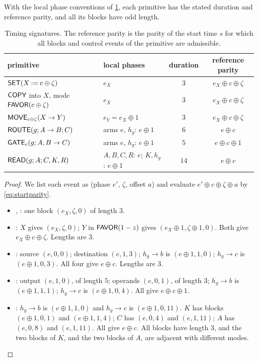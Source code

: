 \begin{lemma}\label{lem:timing}
With the local phase conventions of \cref{tab:timing}, each primitive has the stated duration and
reference parity, and all its blocks have odd length.
\end{lemma}

\begin{table}[ht]
\centering\small
\begin{tabular}{>{\raggedright\arraybackslash}p{4.2cm}>{\raggedright\arraybackslash}p{4.3cm}cc}\toprule
primitive & local phases & duration & reference parity\\\midrule
$\textsf{SET}(X\mathbin{:=}c\oplus\zeta)$ & $e_X$ & $3$ & $e_X\oplus c\oplus\zeta$\\
$\textsf{COPY}$ into $X$, mode $\textsf{FAVOR}(c\oplus\zeta)$ & $e_X$ & $3$ & $e_X\oplus c\oplus\zeta$\\
$\textsf{MOVE}_{c\oplus\zeta}(X\to Y)$ & $e_Y=e_X\oplus 1$ & $3$ & $e_X\oplus c\oplus\zeta$\\
$\textsf{ROUTE}(g;A\to B;C)$ & arms $e$, $h_g$: $e\oplus1$ & $6$ & $e\oplus c$\\
$\textsf{GATE}_c(g;A,B\to C)$ & arms $e$, $h_g$: $e\oplus1$ & $5$ & $e\oplus c\oplus 1$\\
$\textsf{READ}(g;A;C,K,R)$ & $A,B,C,R$: $e$; $K,h_g$: $e\oplus1$ & $14$ & $e\oplus c$\\\bottomrule
\end{tabular}
\caption{Timing signatures. The reference parity is the parity of the start time $s$ for which all
blocks and control events of the primitive are admissible.}
\label{tab:timing}
\end{table}

\begin{proof}
We list each event as (phase $e'$, $\zeta$, offset $a$) and evaluate $e'\oplus c\oplus\zeta\oplus a$
by \eqref{eq:startparity}.
\begin{itemize}
\item {}, : one block $(e_X,\zeta,0)$ of length $3$.
\item {}: $X$ gives $(e_X,\zeta,0)$; $Y$ in $\textsf{FAVOR}(1-z)$ gives
  $(e_X\oplus1,\zeta\oplus 1,0)$. Both give $e_X\oplus c\oplus\zeta$. Lengths are $3$.
\item {}: source $(e,0,0)$; destination $(e,1,3)$; $h_g\to b$ is $(e\oplus1,1,0)$; $h_g\to c$
  is $(e\oplus1,0,3)$. All four give $e\oplus c$. Lengths are $3$.
\item {}: output $(e,1,0)$, of length $5$; operands $(e,0,1)$, of length $3$; $h_g\to b$ is
  $(e\oplus1,1,1)$; $h_g\to c$ is $(e\oplus1,0,4)$. All give $e\oplus c\oplus1$.
\item {}: $h_g\to b$ is $(e\oplus1,1,0)$ and $h_g\to c$ is $(e\oplus1,0,11)$. $K$ has blocks
  $(e\oplus1,0,1)$ and $(e\oplus1,1,4)$; $C$ has $(e,0,4)$ and $(e,1,11)$; $A$ has $(e,0,8)$ and
  $(e,1,11)$. All give $e\oplus c$. All blocks have length $3$, and the two blocks of $K$, and the
  two blocks of $A$, are adjacent with different modes.\qedhere
\end{itemize}
\end{proof}

